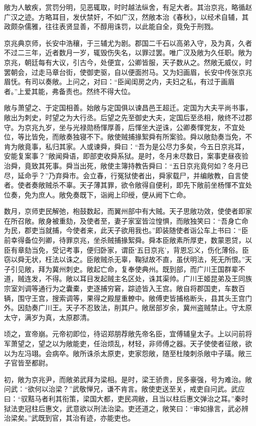 \documentclass[]{article}
\begin{document}
敞为人敏疾，赏罚分明，见恶辄取，时时越法纵舍，有足大者。其治京兆，略循赵广汉之迹。方略耳目，发伏禁奸，不如广汉，然敞本治《春秋》，以经术自辅，其政颇杂儒雅，往往表贤显善，不醇用诛罚，以此能自全，竟免于刑戮。

京兆典京师，长安中浩穰，于三辅尤为剧。郡国二千石以高弟入守，及为真，久者不过二三年，近者数月一岁，辄毁伤失名，以罪过罢。唯广汉及敞为久任职。敞为京兆，朝廷每有大议，引古今，处便宜，公卿皆服，天子数从之。然敞无威仪，时罢朝会，过走马章台街，使御吏驱，自以便面拊马。又为妇画眉，长安中传张京兆眉怃。有司以奏敞。上问之，对曰：``臣闻闺房之内，夫妇之私，有过于画眉者。''上爱其能，弗备责也。然终不得大位。

敞与萧望之、于定国相善。始敞与定国俱以谏昌邑王超迁。定国为大夫平尚书事，敞出为刺史，时望之为大行丞。后望之先至御史大夫，定国后至丞相，敞终不过郡守。为京兆九岁，坐与光禄勋杨惲厚善，后惲坐大逆诛，公卿奏惲党友，不宜处位，等比皆免，而敞奏独寝不下。敞使贼捕掾絮舜有所案验。舜以敞劾奏当免，不肯为敞竟事，私归其家。人或谏舜，舜曰：``吾为是公尽力多矣，今五日京兆耳，安能复案事？''敞闻舜语，即部吏收舜系狱。是时，冬月未尽数日，案事吏昼夜验治舜，竟致其死事。舜当出死，敞使主簿持教告舜曰：``五日京兆竟何如？冬月已尽，延命乎？''乃弃舜市。会立春，行冤狱使者出，舜家载尸，并编敞教，自言使者。使者奏敞贼杀不辜。天子薄其罪，欲令敞得自便利，即先下敞前坐杨惲不宜处位奏，免为庶人。敞免奏既下，诣阙上印绶，便从阙下亡命。

数月，京师吏民解弛，枹鼓数起，而翼州部中有大贼。天子思敞功效，使使者即家在所召敞。敞身被重劾，及使者至，妻子家室皆泣惶惧，而敞独笑曰：``吾身亡命为民，郡吏当就捕，今使者来，此天子欲用我也。''即装随使者诣公车上书曰：``臣前幸得备位列卿，待罪京兆，坐杀贼捕掾絮舜。舜本臣敞素所厚吏，数蒙恩贷，以臣有章劾当免，受记考事，便归卧家，谓臣`五日京兆'，背恩忘义，伤化薄俗。臣窃以舜无状，枉法以诛之。臣敞贼杀无辜，鞠狱故不直，虽伏明法，死无所恨。''天子引见敞，拜为冀州刺史。敞起亡命，复奉使典州。既到部，而广川王国群辈不道，贼连发，不得。敞以耳目发起贼主名区处，诛其渠帅。广川王姬昆弟及王同族宗室刘调等通行为之囊橐，吏逐捕穷窘，踪迹皆入王宫。敞自将郡国吏，车数百辆，围守王宫，搜索调等，果得之殿屋重轑中。敞傅吏皆捕格断头，县其头王宫门外。因劾奏广川王。天子不忍致法，削其户。敞居部岁余，冀州盗贼禁止。守太原太守，满岁为真，太原郡清。

顷之，宣帝崩。元帝初即位，待诏郑朋荐敞先帝名臣，宜傅辅皇太子。上以问前将军萧望之，望之以为敞能吏，任治烦乱，材轻，非师傅之器。天子使使者征敞，欲以为左冯翊。会病卒。敞所诛杀太原吏，吏家怨敞，随至杜陵刺杀敞中子璜。敞三子官皆至都尉。

初，敞为京兆尹，而敞弟武拜为梁相。是时，梁王骄贵，民多豪强，号为难治。敞问武：``欲何以治梁？''武敬惮兄，谦不肯言。敞使吏送至关，戒吏自问武。武应曰：``驭黠马者利其衔策，梁国大都，吏民凋敝，且当以柱后惠文弹治之耳。''秦时狱法吏冠柱后惠文，武意欲以刑法治梁。吏还道之，敞笑曰：``审如掾言，武必辨治梁矣。''武既到官，其治有迹，亦能吏也。
\end{document}
